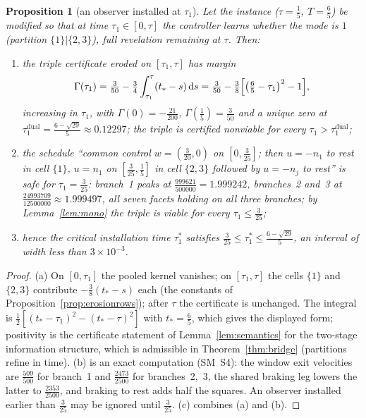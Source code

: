 \documentclass[11pt,a4paper]{article}
\theoremstyle{plain}
\newtheorem{proposition}[theorem]{Proposition}
\theoremstyle{definition}
\theoremstyle{remark}
\newcommand{\tfr}[2]{\tfrac{#1}{#2}}
\newcommand{\dd}{\,\mathrm{d}}
\begin{document}
\begin{proposition}[an observer installed at $\tau_1$]\label{prop:observer}
Let the instance ($\tau=\tfr15$, $T=\tfr65$) be modified so that at time $\tau_1\in[0,\tau]$ the controller learns whether the mode is $1$ (partition $\{1\}|\{2,3\}$), full revelation remaining at $\tau$. Then:
\begin{enumerate}[label=\textup{(\alph*)},leftmargin=2.2em,itemsep=1pt]
\item the triple certificate eroded on $[\tau_1,\tau]$ has margin
\[
\Gamma(\tau_1)=\tfr3{50}-\tfr34\int_{\tau_1}^{\tau}(t_\ast-s)\dd s=\tfr3{50}-\tfr38\Bigl[\bigl(\tfr65-\tau_1\bigr)^2-1\Bigr],
\]
increasing in $\tau_1$, with $\Gamma(0)=-\tfr{21}{200}$, $\Gamma(\tfr15)=\tfr3{50}$ and a unique zero at $\tau_1^{\mathrm{dual}}=\tfr{6-\sqrt{29}}5\approx0.12297$; the triple is certified nonviable for every $\tau_1>\tau_1^{\mathrm{dual}}$;
\item the schedule ``common control $w=(\tfr3{20},0)$ on $[0,\tfr3{25}]$; then $u=-n_1$ to rest in cell $\{1\}$, $u=n_1$ on $[\tfr3{25},\tfr15]$ in cell $\{2,3\}$ followed by $u=-n_j$ to rest'' is safe for $\tau_1=\tfr3{25}$: branch~1 peaks at $\tfr{999621}{500000}=1.999242$, branches~2 and~3 at $\tfr{24993709}{12500000}\approx1.999497$, all seven facets holding on all three branches; by Lemma~\ref{lem:mono} the triple is viable for every $\tau_1\le\tfr3{25}$;
\item hence the critical installation time $\tau_1^\ast$ satisfies $\tfr3{25}\le\tau_1^\ast\le\tfr{6-\sqrt{29}}5$, an interval of width less than $3\times10^{-3}$.
\end{enumerate}
\end{proposition}

\begin{proof}
(a) On $[0,\tau_1]$ the pooled kernel vanishes; on $[\tau_1,\tau]$ the cells $\{1\}$ and $\{2,3\}$ contribute $-\tfr38(t_\ast-s)$ each (the constants of Proposition~\ref{prop:erosionrows}); after $\tau$ the certificate is unchanged. The integral is $\tfr12[(t_\ast-\tau_1)^2-(t_\ast-\tau)^2]$ with $t_\ast=\tfr65$, which gives the displayed form; positivity is the certificate statement of Lemma~\ref{lem:semantics} for the two-stage information structure, which is admissible in Theorem~\ref{thm:bridge} (partitions refine in time). (b) is an exact computation (SM~S4): the window exit velocities are $\tfr{509}{500}$ for branch~1 and $\tfr{2473}{2500}$ for branches~2,~3, the shared braking leg lowers the latter to $\tfr{2353}{2500}$, and braking to rest adds half the squares. An observer installed earlier than $\tfr3{25}$ may be ignored until $\tfr3{25}$. (c) combines (a) and (b).
\end{proof}
\end{document}

